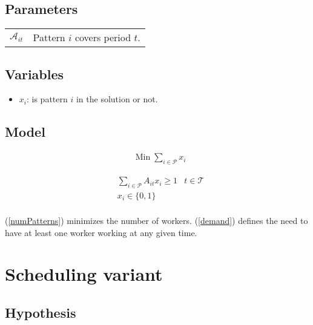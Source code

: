 \documentclass[a4paper,11pt]{article}
\begin{document}
    \vskip 0.3cm

    \subsection{Parameters}

    \begin{tabular}{ll}
        $\mathcal{A}_{it}$ & Pattern $i$ covers period $t$.\\
    \end{tabular}

    \vskip 0.3cm

    \subsection{Variables}

    \begin{itemize}
     \item $x_i$: is pattern $i$ in the solution or not.
    \end{itemize}

    \subsection{Model}

    \begin{align}
        & \text{Min}\; \sum_{i \in \mathcal{P}} x_i \label{numPatterns}
    \end{align}

    \begin{align}
        & \sum_{i \in \mathcal{P}} A_{it}x_{i} \geq 1 & t \in \mathcal{T} \label{demand} \\
        & x_{i} \in \{0, 1\} \\
    \end{align}

    (\ref{numPatterns}) minimizes the number of workers. (\ref{demand}) defines the need to have at least one worker working at any given time.  

\clearpage

\section{Scheduling variant}

    \subsection{Hypothesis}
\end{document}
